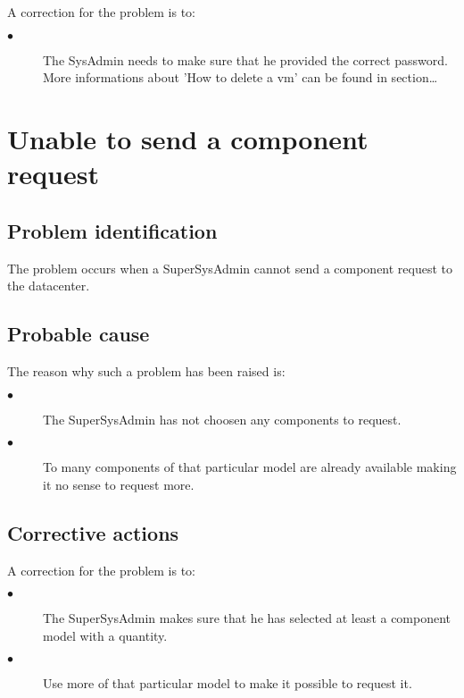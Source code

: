 A correction for the problem is to:\\
\begin{description}
\item[$\bullet$] The SysAdmin needs to make sure that he provided the correct
password. More informations about 'How to delete a vm' can be found in
section\ldots

\end{description}






\section{Unable to send a component request}

\subsection{Problem identification}
The problem occurs when a SuperSysAdmin cannot send a component request to the
datacenter.

\subsection{Probable cause}

The reason why such a problem has been raised is:\\
\begin{description}
\item[$\bullet$] The SuperSysAdmin has not choosen any components to request.
\item[$\bullet$] To many components of that particular model are already
available making it no sense to request more.
\end{description}


\subsection{Corrective actions}

A correction for the problem is to:\\
\begin{description}
\item[$\bullet$] The SuperSysAdmin makes sure that he has selected at least a
component model with a quantity.
\item[$\bullet$] Use more of that particular model to make it possible to
request it.
\end{description}







